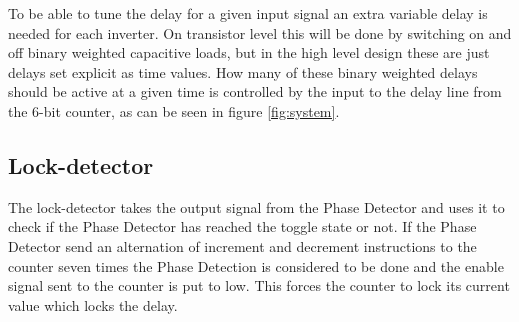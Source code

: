 \documentclass[a4paper,12pt]{article} \usepackage{graphicx}
\begin{document}
To be able to tune the delay for a given input signal an extra
variable delay is needed for each inverter. On transistor level this
will be done by switching on and off binary weighted capacitive loads,
but in the high level design these are just delays set explicit as time
values. How many of these binary weighted delays should be active at a
given time is controlled by the input to the delay line from the 6-bit
counter, as can be seen in figure \ref{fig:system}. 


\subsection{Lock-detector}
The lock-detector takes the output signal from the Phase Detector and uses
it to check if the Phase Detector has reached the toggle state or not. If the Phase
Detector send an alternation of increment and decrement instructions to the counter
seven times the Phase Detection is considered to be done and the enable 
signal sent to the counter is put to low. This forces the counter to lock its 
current value which locks the delay.
\end{document}
